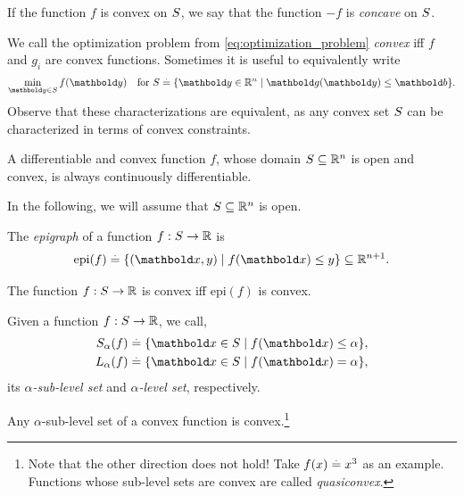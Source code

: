 \begin{rmk}
If the function $f$ is convex on $S$, we say that the function $-f$ is \emph{concave} on $S$.
\end{rmk}

\begin{rmk}
We call the optimization problem from \cref{eq:optimization_problem} \emph{convex} iff $f$ and $g_i$ are convex functions. Sometimes it is useful to equivalently write \begin{align}
    \min_{\vy \in \sS} f(\vy) \quad\text{for }\sS \defeq \{\vy \in \R^n \mid \vg(\vy) \leq \vb\}.
\end{align} Observe that these characterizations are equivalent, as any convex set $S$ can be characterized in terms of convex constraints.
\end{rmk}

\begin{fct} A differentiable and convex function $f$, whose domain $S \subseteq \mathbb{R}^n$ is open and convex, is always continuously differentiable.
\end{fct} In the following, we will assume that $S \subseteq \mathbb{R}^n$ is open.

\begin{defn}[Epigraph]
The \emph{epigraph} of a function $f : S \to \mathbb{R}$ is \begin{align}
    \mathrm{epi}(f) \defeq \{(\vx,y) \mid f(\vx) \leq y\} \subseteq \R^{n+1}.
\end{align}
\end{defn}
\begin{exc}\label{exc:convex_iff_epi_convex}
The function $f : S \to \mathbb{R}$ is convex iff $\mathrm{epi}(f)$ is convex.
\end{exc}

\begin{defn} Given a function $f : S \to \mathbb{R}$, we call, \begin{align}
    \sS_\alpha(f) &\defeq \{\vx \in \sS \mid f(\vx) \leq \alpha\}, \\
    \sL_\alpha(f) &\defeq \{\vx \in \sS \mid f(\vx) = \alpha\},
\end{align} its \emph{$\alpha$-sub-level set} and \emph{$\alpha$-level set}, respectively.
\end{defn}
\begin{exc}\label{exc:sub_level_set_of_convex_function_convex}
Any $\alpha$-sub-level set of a convex function is convex.\footnote{Note that the other direction does not hold! Take $f(x) \overset{.}{=} x^3$ as an example. Functions whose sub-level sets are convex are called \emph{quasiconvex}.}
\end{exc}

